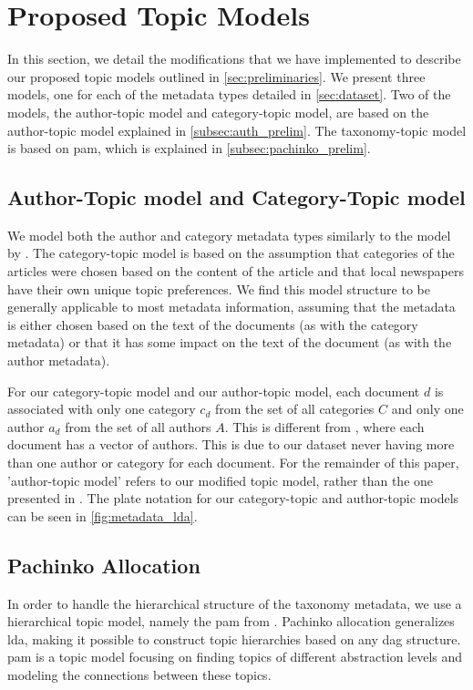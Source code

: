 \section{Proposed Topic Models}\label{sec:plate_notation}
In this section, we detail the modifications that we have implemented to describe our proposed topic models outlined in \autoref{sec:preliminaries}.
We present three models, one for each of the metadata types detailed in \autoref{sec:dataset}.
Two of the models, the author-topic model and category-topic model, are based on the author-topic model explained in \autoref{subsec:auth_prelim}.
The taxonomy-topic model is based on \gls{pam}, which is explained in \autoref{subsec:pachinko_prelim}.

\subsection{Author-Topic model and Category-Topic model}
We model both the author and category metadata types similarly to the model by \citet{author_topic_2012}.
The category-topic model is based on the assumption that categories of the articles were chosen based on the content of the article and that local newspapers have their own unique topic preferences.
We find this model structure to be generally applicable to most metadata information, assuming that the metadata is either chosen based on the text of the documents (as with the category metadata) or that it has some impact on the text of the document (as with the author metadata).

For our category-topic model and our author-topic model, each document $d$ is associated with only one category $c_d$ from the set of all categories $C$ and only one author $a_d$ from the set of all authors $A$.
This is different from \citet{author_topic_2012}, where each document has a vector of authors.
This is due to our dataset never having more than one author or category for each document.
For the remainder of this paper, 'author-topic model' refers to our modified topic model, rather than the one presented in \citet{author_topic_2012}.
The plate notation for our category-topic and author-topic models can be seen in \autoref{fig:metadata_lda}.

\subsection{Pachinko Allocation}\label{subsec:pam}
In order to handle the hierarchical structure of the taxonomy metadata, we use a hierarchical topic model, namely the \acrfull{pam} from \citet{li2006pachinko}.
Pachinko allocation generalizes \gls{lda}, making it possible to construct topic hierarchies based on any \gls{dag} structure.
\gls{pam} is a topic model focusing on finding topics of different abstraction levels and modeling the connections between these topics.


